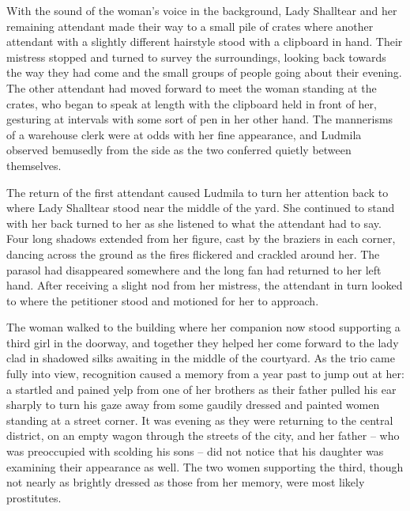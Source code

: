 

With the sound of the woman’s voice in the background, Lady Shalltear and her remaining attendant made their way to a small pile of crates where another attendant with a slightly different hairstyle stood with a clipboard in hand. Their mistress stopped and turned to survey the surroundings, looking back towards the way they had come and the small groups of people going about their evening. The other attendant had moved forward to meet the woman standing at the crates, who began to speak at length with the clipboard held in front of her, gesturing at intervals with some sort of pen in her other hand. The mannerisms of a warehouse clerk were at odds with her fine appearance, and Ludmila observed bemusedly from the side as the two conferred quietly between themselves.

 

The return of the first attendant caused Ludmila to turn her attention back to where Lady Shalltear stood near the middle of the yard. She continued to stand with her back turned to her as she listened to what the attendant had to say. Four long shadows extended from her figure, cast by the braziers in each corner, dancing across the ground as the fires flickered and crackled around her. The parasol had disappeared somewhere and the long fan had returned to her left hand. After receiving a slight nod from her mistress, the attendant in turn looked to where the petitioner stood and motioned for her to approach.

 

The woman walked to the building where her companion now stood supporting a third girl in the doorway, and together they helped her come forward to the lady clad in shadowed silks awaiting in the middle of the courtyard. As the trio came fully into view, recognition caused a memory from a year past to jump out at her: a startled and pained yelp from one of her brothers as their father pulled his ear sharply to turn his gaze away from some gaudily dressed and painted women standing at a street corner. It was evening as they were returning to the central district, on an empty wagon through the streets of the city, and her father – who was preoccupied with scolding his sons – did not notice that his daughter was examining their appearance as well. The two women supporting the third, though not nearly as brightly dressed as those from her memory, were most likely prostitutes.

 

